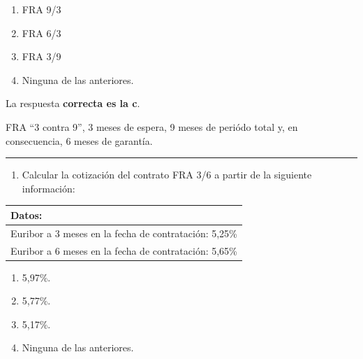 \documentclass[
  letterpaper,
  DIV=11,
  numbers=noendperiod]{scrreprt}
\providecommand{\tightlist}{%
  \setlength{\itemsep}{0pt}\setlength{\parskip}{0pt}}\usepackage{longtable,booktabs,array}
\begin{document}
\begin{enumerate}
\def\labelenumi{\alph{enumi}.}
\item
  FRA 9/3
\item
  FRA 6/3
\item
  FRA 3/9
\item
  Ninguna de las anteriores.
\end{enumerate}

\begin{tcolorbox}[enhanced jigsaw, left=2mm, opacityback=0, colback=white, breakable, arc=.35mm, bottomrule=.15mm, rightrule=.15mm, toprule=.15mm, leftrule=.75mm, colframe=quarto-callout-tip-color-frame]
\begin{minipage}[t]{5.5mm}
\textcolor{quarto-callout-tip-color}{\faLightbulb}
\end{minipage}%
\begin{minipage}[t]{\textwidth - 5.5mm}

La respuesta \textbf{correcta es la c}.

FRA ``3 contra 9'', 3 meses de espera, 9 meses de periódo total y, en
consecuencia, 6 meses de garantía.

\end{minipage}%
\end{tcolorbox}

\begin{center}\rule{0.5\linewidth}{0.5pt}\end{center}

\begin{enumerate}
\def\labelenumi{\arabic{enumi}.}
\setcounter{enumi}{50}
\tightlist
\item
  Calcular la cotización del contrato FRA 3/6 a partir de la siguiente
  información:
\end{enumerate}

\begin{longtable}[]{@{}l@{}}
\toprule()
\textbf{Datos:} \\
\midrule()
\endhead
Euribor a 3 meses en la fecha de contratación: 5,25\% \\
Euribor a 6 meses en la fecha de contratación: 5,65\% \\
\bottomrule()
\end{longtable}

\begin{enumerate}
\def\labelenumi{\alph{enumi}.}
\item
  5,97\%.
\item
  5,77\%.
\item
  5,17\%.
\item
  Ninguna de las anteriores.
\end{enumerate}
\end{document}
